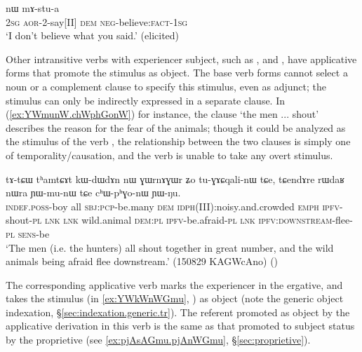 \begin{exe}
\ex \label{ex:tAtWtWt.nW.mAstua}
 nɯ mɤ-stu-a \\
\textsc{2sg} \textsc{aor}-2-say[II] \textsc{dem} \textsc{neg}-believe:\textsc{fact}-\textsc{1sg} \\
\glt `I don't believe what you said.' (elicited)
\end{exe}

Other intransitive verbs with experiencer subject, such as ,  and , have applicative forms that promote the stimulus as object. The base verb forms cannot select a noun or a complement clause to specify this stimulus, even as adjunct; the stimulus can only be indirectly expressed in a separate clause. In (\ref{ex:YWmunW.chWphGonW}) for instance, the clause  `the men ... shout' describes the reason for the fear of the animals; though it could be analyzed as the stimulus of the verb , the relationship between the two clauses is simply one of temporality/causation, and the verb  is unable to take any overt stimulus.

\begin{exe}
\ex \label{ex:YWmunW.chWphGonW}
\gll  tɤ-tɕɯ tʰamtɕɤt kɯ-dɯ\redp{}dɤn nɯ ɣɯrnɤɣɯr ʑo tu-ɣɤɕqali-nɯ tɕe, tɕendɤre rɯdaʁ nɯra ɲɯ-mu-nɯ tɕe cʰɯ-pʰɣo-nɯ ɲɯ-ŋu. \\
\textsc{indef}.\textsc{poss}-boy all \textsc{sbj}:\textsc{pcp}-be.many \textsc{dem} \textsc{idph}(III):noisy.and.crowded \textsc{emph} \textsc{ipfv}-shout-\textsc{pl} \textsc{lnk} \textsc{lnk} wild.animal \textsc{dem}:\textsc{pl} \textsc{ipfv}-be.afraid-\textsc{pl} \textsc{lnk} \textsc{ipfv}:\textsc{downstream}-flee-\textsc{pl} \textsc{sens}-be \\
\glt `The men (i.e. the hunters) all shout together in great number, and the wild animals being afraid flee downstream.' (150829 KAGWcAno)
()
\end{exe}

The corresponding applicative verb  marks the experiencer in the ergative, and takes the stimulus (in \ref{ex:YWkWnWGmu}, ) as object (note the generic object indexation, §\ref{sec:indexation.generic.tr}). The referent promoted as object by the applicative derivation in this verb is the same as that promoted to subject status by the proprietive  (see \ref{ex:pjAsAGmu.pjAnWGmu}, §\ref{sec:proprietive}).

